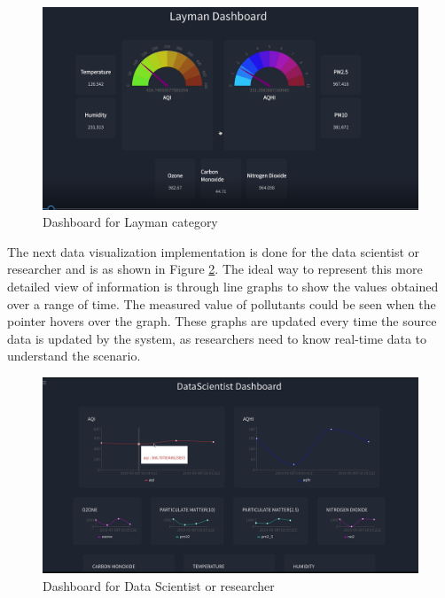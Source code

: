 \begin{figure}[h]
  \begin{center}
  \includegraphics[scale=0.45]{./images/figure14.png}
  \end{center}
  \caption{Dashboard for Layman category}
  \label{view1}
\end{figure}

\hspace{1 cm}

The next data visualization implementation is done for the  data scientist or researcher and is as shown in Figure \ref{view2}. The ideal way to represent this more detailed view of information is through line graphs to show the values obtained over a range of time. The measured value of pollutants could be seen when the pointer hovers over the graph. These graphs are updated every time the source data is updated by the system, as researchers need to know real-time data to understand the scenario. 


\begin{figure}[h]
  \begin{center}
  \includegraphics[scale=0.40]{./images/figure15.png}
  \end{center}
  \caption{Dashboard for Data Scientist or researcher}
  \label{view2}
\end{figure}


